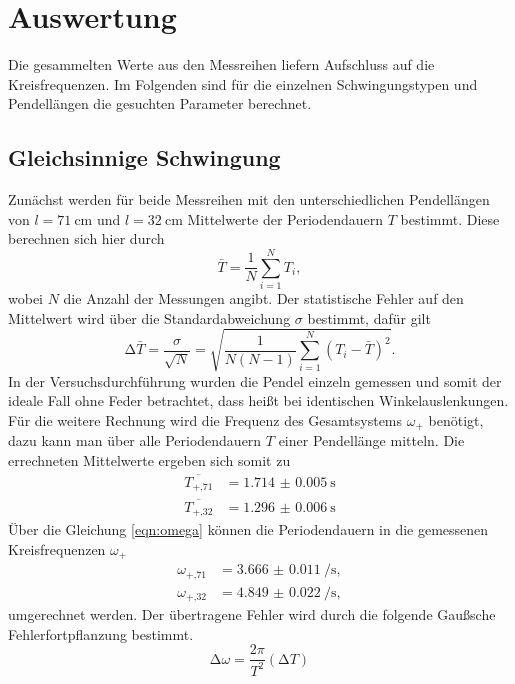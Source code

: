 \section{Auswertung}

Die gesammelten Werte aus den Messreihen liefern Aufschluss auf die Kreisfrequenzen. Im Folgenden sind für die einzelnen Schwingungstypen und Pendellängen die gesuchten Parameter berechnet.

\subsection{Gleichsinnige Schwingung}
Zunächst werden für beide Messreihen mit den unterschiedlichen Pendellängen von $l = \SI{71}{\centi\meter}$ und $l = \SI{32}{\centi\meter}$ Mittelwerte der Periodendauern $T$ bestimmt.
Diese berechnen sich hier durch 
\begin{equation}
    \label{eqn:mean}
\bar{T} = \frac{1}{N} \sum_{i=1}^{N} T_{i},
\end{equation}
wobei $N$ die Anzahl der Messungen angibt. Der statistische Fehler auf den Mittelwert wird über die Standardabweichung $\sigma$ bestimmt, dafür gilt
\begin{equation}
    \label{eqn:sem}
\increment \bar{T} = \frac{\sigma}{\sqrt{N}} = \sqrt{\frac{1}{N(N-1)} \sum_{i=1}^{N} (T_{i} - \bar{T})^{2}}.
\end{equation}
In der Versuchsdurchführung wurden die Pendel einzeln gemessen und somit der ideale Fall ohne Feder betrachtet, dass heißt bei identischen Winkelauslenkungen.
Für die weitere Rechnung wird die Frequenz des Gesamtsystems $\omega_{+}$ benötigt, dazu kann man über alle Periodendauern $T$ einer Pendellänge mitteln.
Die errechneten Mittelwerte ergeben sich somit zu
\begin{align}
    \overline{T_{+\text{,}71}} &= \SI{1.714(5)}{\second} \\
    \overline{T_{+\text{,}32}} &= \SI{1.296(6)}{\second} 
\end{align}
Über die Gleichung \eqref{eqn:omega} können die Periodendauern in die gemessenen Kreisfrequenzen $\omega_{+}$ 
\begin{align}
    \omega_{+\text{,}71} &= \SI{3.666(11)}{\per\second}, \\
    \omega_{+\text{,}32} &= \SI{4.849(22)}{\per\second}, 
\end{align}
umgerechnet werden. Der übertragene Fehler wird durch die folgende Gaußsche Fehlerfortpflanzung bestimmt.
\begin{equation}
    \label{eqn:gauss}
\increment \omega = \frac{2 \pi}{T^2} (\increment T)
\end{equation}

